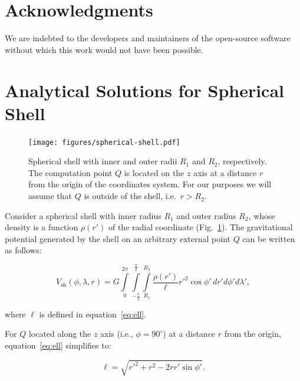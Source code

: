 \documentclass[extra, referee]{gji}
\begin{document}

\section{Acknowledgments}

We are indebted to the developers and maintainers of the open-source software without
which this work would not have been possible.





\appendix

\section{Analytical Solutions for Spherical Shell}
\label{sec:shell}

\begin{figure}
\centering
\texttt{[image: figures/spherical-shell.pdf]}
\caption{
    Spherical shell with inner and outer radii $R_1$ and $R_2$, respectively.
    The computation point $Q$ is located on the $z$ axis at a distance $r$ from
    the origin of the coordinates system.
    For our purposes we will assume that $Q$ is outside of the shell,
    i.e.~$r > R_2$.
}
\label{fig:spherical-shell}
\end{figure}

Consider a spherical shell with inner radius $R_1$ and outer radius $R_2$,
whose density is a function $\rho(r')$ of the radial coordinate
(Fig.~\ref{fig:spherical-shell}).
The gravitational potential generated by the shell on an arbitrary external
point $Q$ can be written as follows:

\begin{equation}
    V_\text{sh}(\phi, \lambda, r) = G
    \int\limits_0^{2\pi}
    \int\limits_{-\frac{\pi}{2}}^\frac{\pi}{2}
    \int\limits_{R_1}^{R_2}
    \frac{\rho(r')}{\ell} {r'}^2 \cos\phi' \,
    dr' d\phi' d\lambda',
\end{equation}

\noindent where $\ell$ is defined in equation~\ref{eq:ell}.

For $Q$ located along the $z$ axis (i.e., $\phi=90^\circ$) at a distance $r$ from the
origin, equation~\ref{eq:ell} simplifies to:

\begin{equation}
    \ell = \sqrt{r'^2 + r^2 - 2 r r' \sin\phi'}.
\end{equation}
\end{document}
